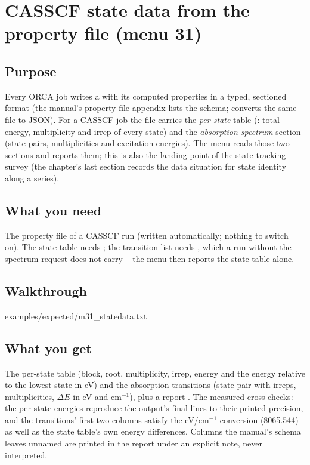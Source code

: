 \chapter{CASSCF state data from the property file (menu 31)}
\label{ch:menu31}

\section{Purpose}

Every ORCA job writes a  with its computed
properties in a typed, sectioned format (the manual's property-file appendix
lists the schema;  converts the same file
to JSON).  For a CASSCF job the file carries the \emph{per-state} table
(: total energy, multiplicity and irrep of every
state) and the \emph{absorption spectrum} section (state pairs, multiplicities
and excitation energies).  The menu reads those two sections and reports them;
this is also the landing point of the state-tracking survey (the
chapter's last section records the data situation for state identity along
a series).

\section{What you need}

The property file of a CASSCF run (written automatically; nothing to switch
on).  The state table needs ; the transition list
needs , which a run without the spectrum
request does not carry -- the menu then reports the state table alone.

\section{Walkthrough}


  {examples/expected/m31_statedata.txt}

\section{What you get}

The per-state table (block, root, multiplicity, irrep, energy and the energy
relative to the lowest state in eV) and the absorption transitions (state
pair with irreps, multiplicities, $\Delta E$ in eV and cm$^{-1}$), plus a
report .  The measured cross-checks: the
per-state energies reproduce the output's final  lines to
their printed precision, and the transitions' first two columns satisfy the
eV/cm$^{-1}$ conversion (8065.544) as well as the state table's own energy
differences.  Columns the manual's schema leaves unnamed are printed in the
report under an explicit note, never interpreted.

